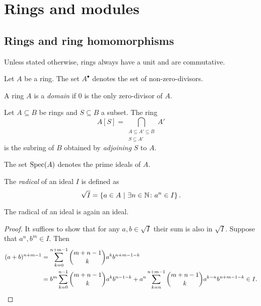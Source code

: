 \section{Rings and modules}

\subsection{Rings and ring homomorphisms}


\begin{definicija}
Unless stated otherwise, rings always have a unit and are
commutative.
\end{definicija}

\begin{definicija}
Let $A$ be a ring. The set $A^\bullet$ denotes the set of
non-zero-divisors.
\end{definicija}

\begin{definicija}
A ring $A$ is a \emph{domain} if $0$ is the only
zero-divisor of $A$.
\end{definicija}

\begin{definicija}
Let $A \subseteq B$ be rings and $S \subseteq B$ a subset. The ring
\[
A[S] =
\bigcap_{\substack{A \subseteq A' \subseteq B \\ S \subseteq A'}}
A'
\]
is the subring of $B$ obtained by \emph{adjoining}
$S$ to $A$.
\end{definicija}

\begin{definicija}
The set $\operatorname{Spec}(A)$ denotes the prime ideals of $A$.
\end{definicija}

\begin{definicija}
The \emph{radical} of an ideal $I$ is defined as
\[
\sqrt{I} = \left\{a \in A~\middle\vert~\exists n \in \mathbb{N} \colon a^n \in I\right\}.
\]
\end{definicija}

\begin{trditev}
The radical of an ideal is again an ideal.
\end{trditev}

\begin{proof}
It suffices to show that for any $a, b \in \sqrt{I}$ their sum is
also in $\sqrt{I}$. Suppose that $a^n, b^m \in I$. Then
\begin{align*}
(a+b)^{n+m-1} &=
\sum_{k=0}^{n+m-1} \binom{m+n-1}{k} a^k b^{n+m-1-k}
\\
&=
b^m \sum_{k=0}^{n-1} \binom{m+n-1}{k} a^k b^{n-1-k} +
a^n \sum_{k=n}^{n+m-1} \binom{m+n-1}{k} a^{k-n} b^{n+m-1-k} \in I.
\qedhere
\end{align*}
\end{proof}

